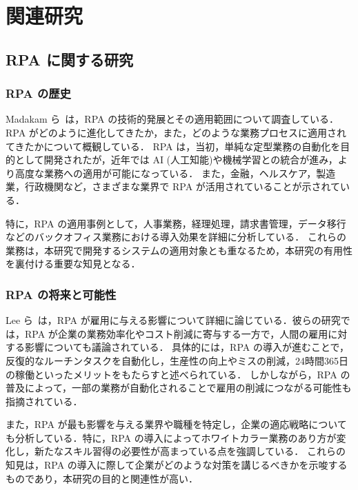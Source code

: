 \chapter{関連研究}
\label{ch:rw}

\quad

\section{RPA に関する研究}
\label{sec:rpa}

\subsection{RPA の歴史}
\label{subsec:rpa_history}

Madakam ら~\cite{Madakam2019}は，RPA の技術的発展とその適用範囲について調査している．RPA がどのように進化してきたか，また，どのような業務プロセスに適用されてきたかについて概観している．
RPA は，当初，単純な定型業務の自動化を目的として開発されたが，近年では AI (人工知能)や機械学習との統合が進み，より高度な業務への適用が可能になっている．
また，金融，ヘルスケア，製造業，行政機関など，さまざまな業界で RPA が活用されていることが示されている．

特に，RPA の適用事例として，人事業務，経理処理，請求書管理，データ移行などのバックオフィス業務における導入効果を詳細に分析している．
これらの業務は，本研究で開発するシステムの適用対象とも重なるため，本研究の有用性を裏付ける重要な知見となる．

\subsection{RPA の将来と可能性}
\label{subsec:rpa_future}

Lee ら~\cite{lee2023}は，RPA が雇用に与える影響について詳細に論じている．彼らの研究では，RPA が企業の業務効率化やコスト削減に寄与する一方で，人間の雇用に対する影響についても議論されている．
具体的には，RPA の導入が進むことで，反復的なルーチンタスクを自動化し，生産性の向上やミスの削減，24時間365日の稼働といったメリットをもたらすと述べられている．
しかしながら，RPA の普及によって，一部の業務が自動化されることで雇用の削減につながる可能性も指摘されている．

また，RPA が最も影響を与える業界や職種を特定し，企業の適応戦略についても分析している．特に，RPA の導入によってホワイトカラー業務のあり方が変化し，新たなスキル習得の必要性が高まっている点を強調している．
これらの知見は，RPA の導入に際して企業がどのような対策を講じるべきかを示唆するものであり，本研究の目的と関連性が高い．

